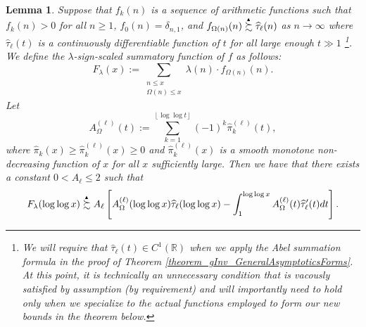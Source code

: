 \documentclass[11pt,reqno,a4letter]{article}
\numberwithin{figure}{section}
\numberwithin{table}{section}
\newcommand{\floor}[1]{\left\lfloor #1 \right\rfloor}
\theoremstyle{plain}
\newtheorem{lemma}[theorem]{Lemma}
\numberwithin{theorem}{section}
\theoremstyle{definition}
\newcommand{\SuccSim}[0]{\overset{_{\scriptsize{\blacktriangle}}}{\succsim}}
\begin{document}
\begin{lemma} 
\label{lemma_CLT_and_AbelSummation} 
Suppose that $f_k(n)$ is a sequence of arithmetic functions 
such that $f_k(n) > 0$ for all $n \geq 1$, $f_0(n) = \delta_{n,1}$, and 
$f_{\Omega(n)}(n) \SuccSim \widehat{\tau}_{\ell}(n)$ as $n \rightarrow \infty$ where 
$\widehat{\tau}_{\ell}(t)$ is a continuously differentiable function of $t$ for all 
large enough $t \gg 1$ \footnote{ 
     We will require that $\widehat{\tau}_{\ell}(t) \in C^{1}(\mathbb{R})$ when we apply the 
     Abel summation formula in the proof of Theorem \ref{theorem_gInv_GeneralAsymptoticsForms}. 
     At this point, it is technically an unnecessary condition that is 
     vacously satisfied by assumption (by requirement) 
     and will importantly need to hold only when we specialize to the 
     actual functions employed to form our new bounds in the theorem below. 
}.  
We define the $\lambda$-sign-scaled summatory function of $f$ as follows: 
\[
F_{\lambda}(x) := \sum_{\substack{n \leq x \\ \Omega(n) \leq x}} 
     \lambda(n) \cdot f_{\Omega(n)}(n). 
\]
Let 
\[
A_{\Omega}^{(\ell)}(t) := \sum_{k=1}^{\floor{\log\log t}} (-1)^k \widehat{\pi}_k^{(\ell)}(t),  
\]
where $\widehat{\pi}_k(x) \geq \widehat{\pi}_k^{(\ell)}(x) \geq 0$ and 
$\widehat{\pi}_k^{(\ell)}(x)$ is a smooth monotone non-decreasing function of $x$ for all $x$ 
sufficiently large. 
Then we have that there exists a constant $0 < A_{\ell} \leq 2$ such that 
\[
F_{\lambda}(\log\log x) \SuccSim A_{\ell}\left[ 
     A_{\Omega}^{(\ell)}(\log\log x) \widehat{\tau}_{\ell}(\log\log x) - 
     \int_1^{\log\log x} 
     A_{\Omega}^{(\ell)}(t) \widehat{\tau}_{\ell}^{\prime}(t) dt 
     \right]. 
\]
\end{lemma}
\end{document}
